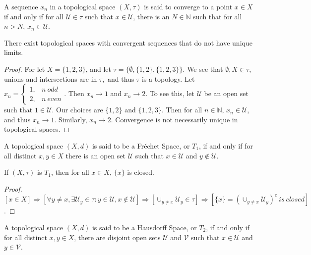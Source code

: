 \documentclass[crop=false,class=article,oneside]{standalone}
\begin{document}
            \begin{definition}
            A sequence $x_n$ in a topological space $(X,\tau)$ is said to converge to a point $x\in X$ if and only if for all $\mathcal{U}\in \tau$ such that $x\in \mathcal{U}$, there is an $N\in \mathbb{N}$ such that for all $n>N$, $x_n \in \mathcal{U}$.
            \end{definition}
            \begin{theorem}
            There exist topological spaces with convergent sequences that do not have unique limits.
            \end{theorem}
            \begin{proof}
            For let $X = \{1,2,3\}$, and let $\tau = \{\emptyset, \{1,2\},\{1,2,3\}\}$. We see that $\emptyset,X\in \tau$, unions and intersections are in $\tau,$ and thus $\tau$ is a topology. Let $x_n = \begin{cases} 1, & n\ odd \\ 2, & n\ even\end{cases}$. Then $x_n \rightarrow 1$ and $x_n \rightarrow 2$. To see this, let $\mathcal{U}$ be an open set such that $1\in \mathcal{U}$. Our choices are $\{1,2\}$ and $\{1,2,3\}$. Then for all $n\in \mathbb{N}$, $x_n \in \mathcal{U}$, and thus $x_n \rightarrow 1$. Similarly, $x_n \rightarrow 2$. Convergence is not necessarily unique in topological spaces.
            \end{proof}
            \begin{definition}
            A topological space $(X,d)$ is said to be a Fr\'{e}chet Space, or $T_1$, if and only if for all distinct $x,y\in X$ there is an open set $\mathcal{U}$ such that $x\in \mathcal{U}$ and $y\notin \mathcal{U}$.
            \end{definition}
            \begin{theorem}
            If $(X,\tau)$ is $T_1$, then for all $x\in X$, $\{x\}$ is closed.
            \end{theorem}
            \begin{proof}
            $[x\in X]\Rightarrow [\forall y\ne x, \exists \mathcal{U}_y\in \tau:y\in \mathcal{U},x\notin\mathcal{U}]\Rightarrow [\cup_{y\ne x}\mathcal{U}_y\in \tau]\Rightarrow [\{x\}=(\cup_{y\ne x}\mathcal{U}_y)^c\ is\ closed]$.
            \end{proof}
            \begin{definition}
            A topological space $(X,d)$ is said to be a Hausdorff Space, or $T_2$, if and only if for all distinct $x,y\in X$, there are disjoint open sets $\mathcal{U}$ and $\mathcal{V}$ such that $x\in \mathcal{U}$ and $y\in \mathcal{V}$.
            \end{definition}
\end{document}
